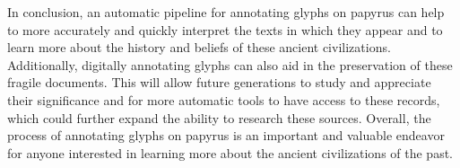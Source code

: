 In conclusion, an automatic pipeline for annotating glyphs on papyrus can help to more accurately and quickly interpret the texts in which they appear and to learn more about the history and beliefs of these ancient civilizations. Additionally, digitally annotating glyphs can also aid in the preservation of these fragile documents. This will allow future generations to study and appreciate their significance and for more automatic tools to have access to these records, which could further expand the ability to research these sources. Overall, the process of annotating glyphs on papyrus is an important and valuable endeavor for anyone interested in learning more about the ancient civilizations of the past.
